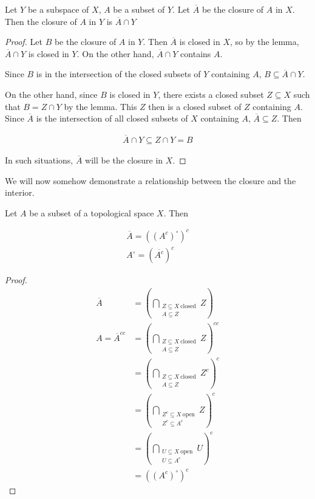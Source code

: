 \documentclass[12pt, twosided]{article}
\begin{document}
\begin{thm}
  Let \(Y\) be a subspace of \(X\), \(A\) be a subset of \(Y\). Let \(\overline{A}\) be the closure of \(A\) in \(X\). Then the closure of \(A\) in \(Y\) is \(\overline{A} \cap Y\)
\end{thm}
\begin{proof}
  Let \(B\) be the closure of \(A\) in \(Y\). Then \(\overline{A}\) is closed in \(X\), so by the lemma, \(\overline{A} \cap Y\) is closed in \(Y\). On the other hand, \(\overline{A} \cap Y\) contains \(A\).

  Since \(B\) is in the intersection of the closed subsets of \(Y\) containing \(A\), \(B \subseteq \overline{A} \cap Y\).\partdone

  On the other hand, since \(B\) is closed in \(Y\), there exists a closed subset \(Z \subseteq X\) such that \(B = Z \cap Y\) by the lemma.
  This \(Z\) then is a closed subset of \(Z\) containing \(A\). Since \(\overline{A}\) is the intersection of all closed subsets of \(X\) containing \(A\), \(\overline{A} \subseteq Z\). Then

  \begin{align*}
    \overline{A} \cap Y \subseteq Z \cap Y = B 
  \end{align*}

  In such situations, \(\overline{A}\) will be the closure in \(X\). 
\end{proof}

We will now somehow demonstrate a relationship between the closure and the interior.

\begin{lm}
  Let \(A\) be a subset of a topological space \(X\). Then

  \begin{align*}
    \overline{A} = ((A^c)^\circ)^c \\
    A^\circ = (\overline{A^c})^c
  \end{align*}
\end{lm}

\begin{proof}
  \begin{align*}
    \overline{A} &=\left(\bigcap_{\substack{Z \subseteq X \mathrm{\ closed} \\ A \subseteq Z}} Z \right) \\
    A = \overline{A}^{cc} &=\left(\bigcap_{\substack{Z \subseteq X \mathrm{\ closed} \\ A \subseteq Z}} Z \right)^{cc} \\
                 &=\left(\bigcap_{\substack{Z \subseteq X \mathrm{\ closed} \\ A \subseteq Z}} Z^c \right)^c \\
                 &=\left(\bigcap_{\substack{Z^c \subseteq X \mathrm{\ open} \\ Z^c \subseteq A^c}} Z \right)^c \\
                 &=\left(\bigcap_{\substack{U \subseteq X \mathrm{\ open} \\ U \subseteq A^c}} U \right)^c \\
                 &= ((A^c)^\circ)^c
   \end{align*}
\end{proof}
\end{document}
